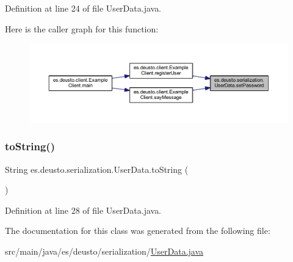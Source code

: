 Definition at line 24 of file User\+Data.\+java.

Here is the caller graph for this function\+:
\nopagebreak
\begin{figure}[H]
\begin{center}
\leavevmode
\includegraphics[width=350pt]{classes_1_1deusto_1_1serialization_1_1_user_data_a28efba1d140f0b371bfc777d1c825614_icgraph}
\end{center}
\end{figure}
\mbox{\label{classes_1_1deusto_1_1serialization_1_1_user_data_ac2a905aeaf972596d8fd135d76c763cd}} 
\subsubsection{\texorpdfstring{toString()}{toString()}}
{\footnotesize\ttfamily String es.\+deusto.\+serialization.\+User\+Data.\+to\+String (\begin{DoxyParamCaption}{ }\end{DoxyParamCaption})}



Definition at line 28 of file User\+Data.\+java.



The documentation for this class was generated from the following file\+:\begin{DoxyCompactItemize}
\item 
src/main/java/es/deusto/serialization/\mbox{\hyperlink{_user_data_8java}{User\+Data.\+java}}\end{DoxyCompactItemize}
